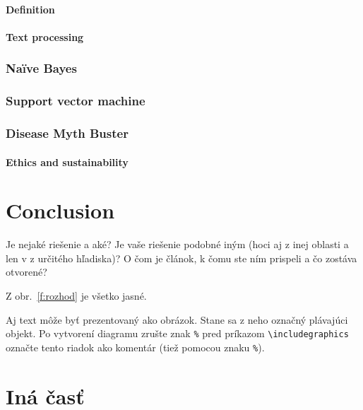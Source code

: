 \documentclass[11pt ,english,a4paper]{article}
\begin{document}
\paragraph{Definition}

\paragraph{Text processing}

\subsubsection{Naïve Bayes}

\subsubsection{Support vector machine}

\subsubsection{Disease Myth Buster}

\paragraph{Ethics and sustainability}%

\section{Conclusion}\label{conclusion}

Je nejaké riešenie a aké?
Je vaše riešenie podobné iným (hoci aj z inej oblasti a len v z určitého hľadiska)?
O čom je článok, k čomu ste ním prispeli a čo zostáva otvorené?

Z obr.~\ref{f:rozhod} je všetko jasné. 

\begin{figure*}[tbh]
\centering
Aj text môže byť prezentovaný ako obrázok. Stane sa z neho označný plávajúci objekt. Po vytvorení diagramu zrušte znak \texttt{\%} pred príkazom \verb|\includegraphics| označte tento riadok ako komentár (tiež pomocou znaku \texttt{\%}).
\caption{Rozhodujuci argument.}
\label{f:rozhod}
\end{figure*}



\section{Iná časť} \label{ina}
\end{document}
